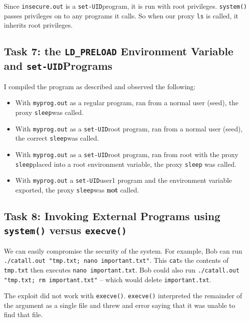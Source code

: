\documentclass[10pt,\jkfside,a4paper]{article}
\newcommand\setuid{\texttt{set-UID}}
\begin{document}
Since \texttt{insecure.out} is a \setuid program, it is run with root
privileges. \texttt{system()} passes privileges on to any programs it calls.
So when our proxy \texttt{ls} is called, it inherits root privileges.

\subsection{Task 7: the \texttt{LD\_PRELOAD} Environment Variable and \setuid Programs}

I compiled the program as described and observed the following:

\newcommand{\sleep}{\texttt{sleep}}

\begin{itemize}

\item With \texttt{myprog.out} as a regular program, ran from a normal user
(seed), the proxy \sleep was called.

\item With \texttt{myprog.out} as a \setuid root program, ran from a normal
user (seed), the correct \sleep was called.

\item With \texttt{myprog.out} as a \setuid root program, ran from root with
the proxy \sleep placed into a root environment variable, the proxy \sleep
was called.

\item With \texttt{myprog.out} a \setuid user1 program and the environment
variable exported, the proxy \sleep was \textbf{not} called.

\end{itemize}

\subsection{Task 8: Invoking External Programs using \texttt{system()} versus \texttt{execve()}}

We can easily compromise the security of the system. For example, Bob can
run \texttt{./catall.out "tmp.txt; nano important.txt"}. This \texttt{cat}s
the contents of \texttt{tmp.txt} then executes \texttt{nano important.txt}.
Bob could also run \texttt{./catall.out "tmp.txt; rm important.txt"} -- which
would delete \texttt{important.txt}.

The exploit did not work with \texttt{execve()}. \texttt{execve()}
interpreted the remainder of the argument as a single file and threw and
error saying that it was unable to find that file.
\end{document}
